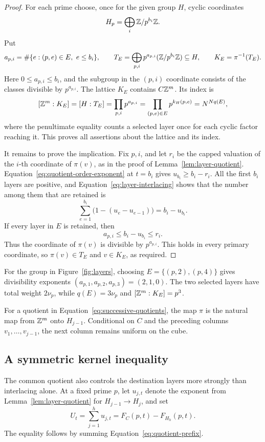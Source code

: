 \begin{proof}
For each prime choose, once for the given group \(H\), cyclic
coordinates
\[
 H_p=\bigoplus_i\mathbb Z/p^{b_i}\mathbb Z.
\]
Put
\[
 a_{p,i}=\#\{e:(p,e)\in E,\ e\le b_i\},\qquad
 T_E=\bigoplus_{p,i}p^{a_{p,i}}(\mathbb Z/p^{b_i}\mathbb Z)\subseteq H,
 \qquad K_E=\pi^{-1}(T_E).
\]
Here \(0\le a_{p,i}\le b_i\), and the subgroup in the \((p,i)\)
coordinate consists of the classes divisible by \(p^{a_{p,i}}\).
The lattice \(K_E\) contains \(C\mathbb Z^m\). Its index is
\[
 [\mathbb Z^m:K_E]=[H:T_E]
 =\prod_{p,i}p^{a_{p,i}}
 =\prod_{(p,e)\in E}p^{k_H(p,e)}
 =N^{Nq(E)},
\]
where the penultimate equality counts a selected layer once for each
cyclic factor reaching it. This proves all assertions about the lattice
and its index.

It remains to prove the implication. Fix \(p,i\), and let \(r_i\) be
the capped valuation of the \(i\)-th coordinate of \(\pi(v)\), as in
the proof of Lemma~\ref{lem:layer-quotient}. Equation~\eqref{eq:quotient-order-exponent}
at \(t=b_i\) gives \(u_{b_i}\ge b_i-r_i\). All the first \(b_i\)
layers are positive, and Equation~\eqref{eq:layer-interlacing} shows
that the number among them that are retained is
\[
 \sum_{e=1}^{b_i}\bigl(1-(u_e-u_{e-1})\bigr)=b_i-u_{b_i}.
\]
If every layer in \(E\) is retained, then
\[
 a_{p,i}\le b_i-u_{b_i}\le r_i.
\]
Thus the coordinate of \(\pi(v)\) is divisible by \(p^{a_{p,i}}\).
This holds in every primary coordinate, so \(\pi(v)\in T_E\) and
\(v\in K_E\), as required.
\end{proof}

For the group in Figure~\ref{fig:layers}, choosing
\(E=\{(p,2),(p,4)\}\) gives divisibility exponents
\((a_{p,1},a_{p,2},a_{p,3})=(2,1,0)\). The two selected layers have
total weight \(2\nu_p\), while \(q(E)=3\nu_p\) and
\([\mathbb Z^m:K_E]=p^3\).

For a quotient in Equation~\eqref{eq:successive-quotients}, the map
\(\pi\) is the natural map from \(\mathbb Z^m\) onto \(H_{j-1}\).
Conditional on \(C\) and the preceding columns
\(v_1,\ldots,v_{j-1}\), the next column remains uniform on the cube.

\subsection{A symmetric kernel inequality}

The common quotient also controls the destination layers more strongly
than interlacing alone. At a fixed prime \(p\), let \(u_{j,t}\) denote
the exponent from Lemma~\ref{lem:layer-quotient} for
\(H_{j-1}\to H_j\), and set
\begin{equation}\label{eq:total-quotient-loss}
 U_t=\sum_{j=1}^h u_{j,t}
    =F_C(p,t)-F_{H_h}(p,t).
\end{equation}
The equality follows by summing Equation~\eqref{eq:quotient-prefix}.

